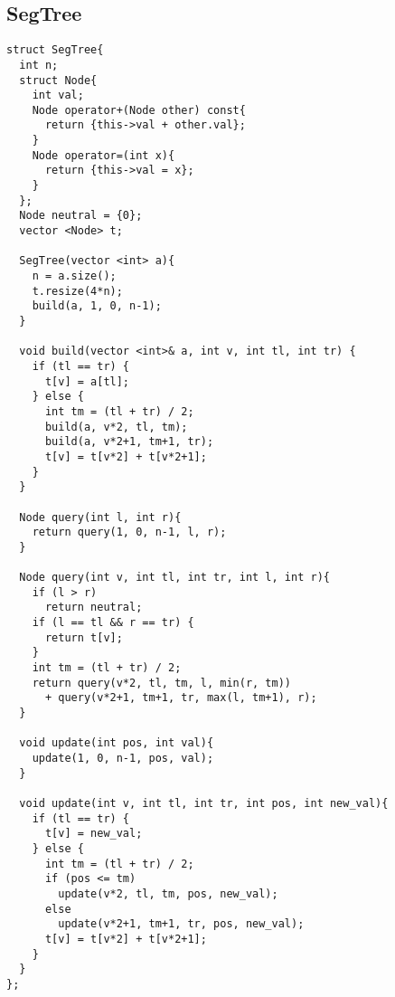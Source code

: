 \documentclass[11pt, a4paper, twoside]{article}
\begin{document}
\subsection{SegTree}
\begin{verbatim}
struct SegTree{
  int n;
  struct Node{
    int val;
    Node operator+(Node other) const{
      return {this->val + other.val};
    }
    Node operator=(int x){
      return {this->val = x};
    }
  };
  Node neutral = {0};
  vector <Node> t;
    
  SegTree(vector <int> a){
    n = a.size();
    t.resize(4*n);
    build(a, 1, 0, n-1);
  }
    
  void build(vector <int>& a, int v, int tl, int tr) {
    if (tl == tr) {
      t[v] = a[tl];
    } else {
      int tm = (tl + tr) / 2;
      build(a, v*2, tl, tm);
      build(a, v*2+1, tm+1, tr);
      t[v] = t[v*2] + t[v*2+1];
    }
  }
    
  Node query(int l, int r){
    return query(1, 0, n-1, l, r);
  }
    
  Node query(int v, int tl, int tr, int l, int r){
    if (l > r) 
      return neutral;
    if (l == tl && r == tr) {
      return t[v];
    }
    int tm = (tl + tr) / 2;
    return query(v*2, tl, tm, l, min(r, tm))
      + query(v*2+1, tm+1, tr, max(l, tm+1), r);
  }
    
  void update(int pos, int val){
    update(1, 0, n-1, pos, val);
  }
    
  void update(int v, int tl, int tr, int pos, int new_val){
    if (tl == tr) {
      t[v] = new_val;
    } else {
      int tm = (tl + tr) / 2;
      if (pos <= tm)
        update(v*2, tl, tm, pos, new_val);
      else
        update(v*2+1, tm+1, tr, pos, new_val);
      t[v] = t[v*2] + t[v*2+1];
    }
  }
};
\end{verbatim}
\end{document}
